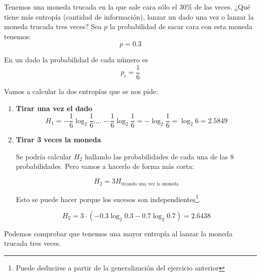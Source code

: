 \begin{problem}[2]
 	Tenemos una moneda trucada en la que sale cara sólo el 30\% de las veces. ¿Qué tiene más entropía (cantidad de información), lanzar un dado una vez o lanzar la moneda trucada tres veces?
 	\solution
 	Sea $p$ la probabilidad de sacar cara con esta moneda tenemos:
 	$$p = 0.3$$

 	En un dado la probabilidad de cada número es
 	$$p_i = \frac{1}{6}$$

 	Vamos a calcular la dos entropías que se nos pide:

 	\begin{enumerate}
 		\item \textbf{Tirar una vez el dado}
 		$$H_1 = - \frac{1}{6} \log_2 \frac{1}{6} .... - \frac{1}{6} \log_2 \frac{1}{6} = - \log_2 \frac{1}{6} = \log_2 6 = 2.5849$$

 		\item \textbf{Tirar 3 veces la moneda}

 		Se podría calcular $H_2$ hallando las probabilidades de cada una de las 8 probabilidades. Pero vamos a hacerlo de forma más corta:

 		$$H_2 = 3H_{\text{tirando una vez la moneda}}$$

 		Esto se puede hacer porque los sucesos son independientes\footnote{Puede deducirse a partir de la generalización del ejercicio anterior}.

 		$$H_2 = 3\cdot(-0.3 \log_2 0.3 - 0.7 \log_2 0.7) = 2.6438$$
 	\end{enumerate}

 	Podemos comprobar que tenemos una mayor entropía al lanzar la moneda trucada tres veces.
 \end{problem}

